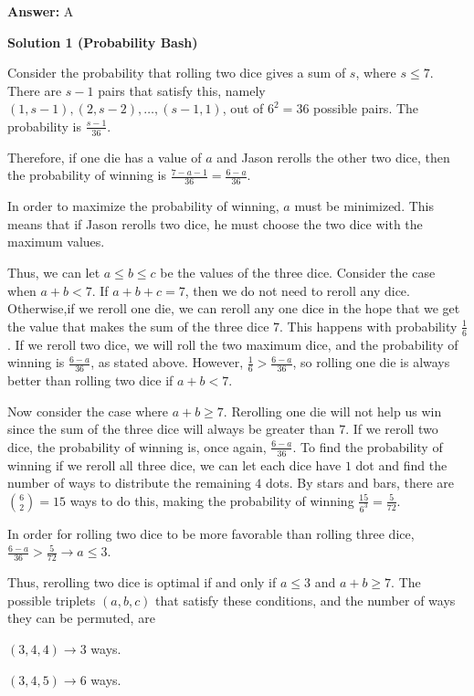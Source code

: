 \begin{enumerate}
 \textbf{Answer: }A



\textbf{Solution 1 (Probability Bash)}

Consider the probability that rolling two dice gives a sum of $s$, where $s \leq 7$. There are $s - 1$ pairs that satisfy this, namely $(1, s - 1), (2, s - 2), \ldots, (s - 1, 1)$, out of $6^2 = 36$ possible pairs. The probability is $\frac{s - 1}{36}$.

 Therefore, if one die has a value of $a$ and Jason rerolls the other two dice, then the probability of winning is $\frac{7 - a - 1}{36} = \frac{6 - a}{36}$.

 In order to maximize the probability of winning, $a$ must be minimized. This means that if Jason rerolls two dice, he must choose the two dice with the maximum values.

 Thus, we can let $a \leq b \leq c$ be the values of the three dice. Consider the case when $a + b < 7$. If $a + b + c = 7$, then we do not need to reroll any dice. Otherwise,if we reroll one die, we can reroll any one dice in the hope that we get the value that makes the sum of the three dice $7$. This happens with probability $\frac16$. If we reroll two dice, we will roll the two maximum dice, and the probability of winning is $\frac{6 - a}{36}$, as stated above. However, $\frac16 > \frac{6 - a}{36}$, so rolling one die is always better than rolling two dice if $a + b < 7$.

 Now consider the case where $a + b \geq 7$. Rerolling one die will not help us win since the sum of the three dice will always be greater than $7$. If we reroll two dice, the probability of winning is, once again, $\frac{6 - a}{36}$. To find the probability of winning if we reroll all three dice, we can let each dice have $1$ dot and find the number of ways to distribute the remaining $4$ dots. By stars and bars, there are ${6\choose2} = 15$ ways to do this, making the probability of winning $\frac{15}{6^3} = \frac5{72}$.

 In order for rolling two dice to be more favorable than rolling three dice, $\frac{6 - a}{36} > \frac5{72} \rightarrow a \leq 3$.

 Thus, rerolling two dice is optimal if and only if $a \leq 3$ and $a + b \geq 7$. The possible triplets $(a, b, c)$ that satisfy these conditions, and the number of ways they can be permuted, are

 $(3, 4, 4) \rightarrow 3$ ways.

 $(3, 4, 5) \rightarrow 6$ ways.


\end{enumerate}

